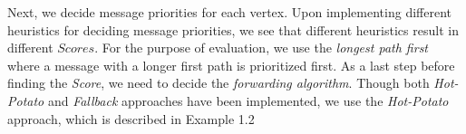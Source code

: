 \documentclass{sig-alternate}[9pt]
\renewcommand{\tt}{\texttt{t\!t}\xspace}
\theoremstyle{definition}
\begin{document}
		Next, we decide message priorities for each vertex. Upon implementing different heuristics for deciding message priorities, we see that different heuristics result in different $Scores$. For the purpose of evaluation, we use the {\em longest path first} where a message with a longer first path is prioritized first. 
		As a last step before finding the {\em Score}, we need to decide the {\em forwarding algorithm}. Though both {\em Hot-Potato} and {\em Fallback} approaches have been implemented, we use the {\em Hot-Potato} approach, which is described in Example 1.2 


\end{document}
